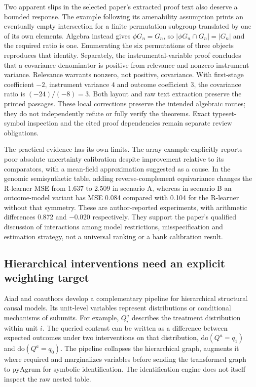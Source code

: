 Two apparent slips in the selected paper's extracted proof text also deserve
a bounded response. The example following its amenability assumption prints
an eventually empty intersection for a finite permutation subgroup translated
by one of its own elements. Algebra instead gives $\phi G_n=G_n$, so
$|\phi G_n\cap G_n|=|G_n|$ and the required ratio is one. Enumerating
the six permutations of three objects reproduces that identity. Separately,
the instrumental-variable proof concludes that a covariance denominator is
positive from relevance and nonzero instrument variance. Relevance warrants
nonzero, not positive, covariance. With first-stage coefficient $-2$,
instrument variance $4$ and outcome coefficient $3$, the covariance ratio
is $(-24)/(-8)=3$. Both layout and raw text extraction preserve the printed
passages. These local corrections preserve the intended algebraic routes;
they do not independently refute or fully verify the theorems. Exact
typeset-symbol inspection and the cited proof dependencies remain separate
review obligations.
\citep{exec23_geometric_models,exec23_structured_reference}

The practical evidence has its own limits. The array example explicitly
reports poor absolute uncertainty calibration despite improvement relative
to its comparators, with a mean-field approximation suggested as a cause.
In the genomic semisynthetic table, adding reverse-complement equivariance
changes the R-learner MSE from 1.637 to 2.509 in scenario A, whereas in
scenario B an outcome-model variant has MSE 0.084 compared with 0.104 for
the R-learner without that symmetry. These are author-reported experiments,
with arithmetic differences 0.872 and $-0.020$ respectively. They support
the paper's qualified discussion of interactions among model restrictions,
misspecification and estimation strategy, not a universal ranking or a bank
calibration result.
\citep{exec23_geometric_models,exec23_structured_reference}

\subsection{Hierarchical interventions need an explicit weighting target}
\label{exec23:structured-target}

Aiad and coauthors develop a complementary pipeline for hierarchical
structural causal models. Its unit-level variables represent distributions
or conditional mechanisms of subunits. For example, $Q_i^a$ describes
the treatment distribution within unit $i$. The queried contrast can be
written as a difference between expected outcomes under two interventions
on that distribution, $\mathrm{do}(Q^a=q_1)$ and
$\mathrm{do}(Q^a=q_0)$. The pipeline collapses the hierarchical graph,
augments it where required and marginalizes variables before sending the
transformed graph to pyAgrum for symbolic identification. The identification
engine does not itself inspect the raw nested table.
\citep{exec23_hierarchical_pipeline}

